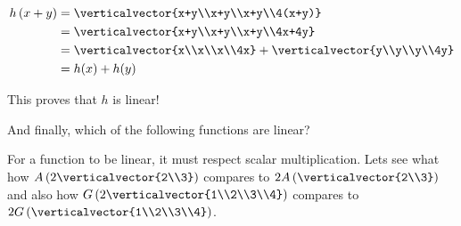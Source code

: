 \documentclass{ximera}
\begin{document}
\begin{question}
\begin{solution}
\begin{hint}
\begin{question}
        	 \begin{align*}
        	 h\left(x+y\right)&= \verticalvector{x+y\\x+y\\x+y\\4(x+y)}\\
        	 &= \verticalvector{x+y\\x+y\\x+y\\4x+4y}\\
        	 &= \verticalvector{x\\x\\x\\4x}+\verticalvector{y\\y\\y\\4y}\\
        	 &=h(x)+h(y)
        	 \end{align*}
		 
        	 This proves that $h$ is linear!
		
        \end{question}
	
    \end{hint}
    \begin{multiple-choice}
    \end{multiple-choice}
  \end{solution}

  And finally, which of the following functions are linear?
  
  \begin{solution}
  
    \begin{hint}
    	For a function to be linear, it must respect scalar multiplication.  Lets see what how $A\left( 2\verticalvector{2\\3}\right)$ compares to 
    	$2A\left(\verticalvector{2\\3}\right)$ and also how $G\left(2\verticalvector{1\\2\\3\\4}\right)$ compares to 
    	$2G\left(\verticalvector{1\\2\\3\\4}\right)$.
	

\end{hint}
\end{solution}
\end{question}
\end{document}
